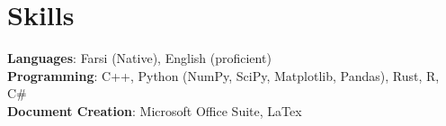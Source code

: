 \documentclass[A4,11pt]{article}
\makeatletter
\newcommand{\CVSubheading}[4]{
  \vspace{-2pt}\item
    \begin{tabular*}{0.97\textwidth}[t]{l@{\extracolsep{\fill}}r}
      \textbf{#1} & #2 \\
      \small#3 & \small #4 \\
    \end{tabular*}\vspace{-7pt}
}
\newcommand{\CVSubHeadingListStart}{\begin{itemize}[leftmargin=0.5cm, label={}]}
\newcommand{\CVSubHeadingListEnd}{\end{itemize}}
\makeatother
\begin{document}
\begin{comment}
\section{Community Involvement}
  \CVSubHeadingListStart
    \CVSubheading
      {Austin College Community Tutors}{Fall 2017 -- Fall 2018}
      {Free tutoring for local students in science and mathematics}{Sherman, TX}
    \CVSubheading
      {River Legacy Nature Center}{September 2015 -- August 2016}
      {Provided assistance for various youth science education programs}{Arlington, TX}
    \CVSubheading
      {Back on My Feet Run Club}{April 2014 -- August 2015}
      {Helping to reestablish homeless persons in the community}{Austin, TX}
  \CVSubHeadingListEnd
\end{comment}
\begin{comment}
This section is compressed from the various skills sections that Euro CV
recommends.
\end{comment}

\section{Skills}
 \begin{itemize}[leftmargin=0.5cm, label={}]
    \small{\item{
     \textbf{Languages}{: Farsi (Native), English (proficient)} \\
     \textbf{Programming}{: C++, Python (NumPy, SciPy, Matplotlib, Pandas), Rust, R, C\#} \\
     \textbf{Document Creation}{: Microsoft Office Suite, LaTex} \\
    }}
 \end{itemize}
    
\end{document}
